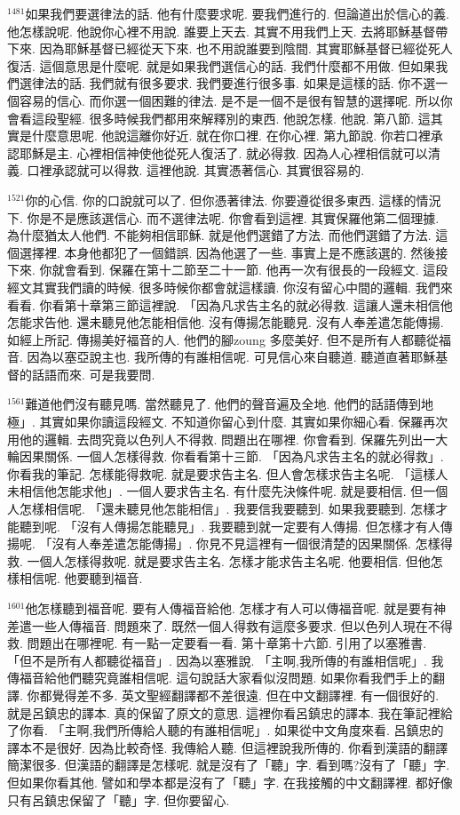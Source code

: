\documentclass{book}
\begin{document}
$^{1481}$如果我們要選律法的話.
他有什麼要求呢.
要我們進行的.
但論道出於信心的義.
他怎樣說呢.
他說你心裡不用說.
誰要上天去.
其實不用我們上天.
去將耶穌基督帶下來.
因為耶穌基督已經從天下來.
也不用說誰要到陰間.
其實耶穌基督已經從死人復活.
這個意思是什麼呢.
就是如果我們選信心的話.
我們什麼都不用做.
但如果我們選律法的話.
我們就有很多要求.
我們要進行很多事.
如果是這樣的話.
你不選一個容易的信心.
而你選一個困難的律法.
是不是一個不是很有智慧的選擇呢.
所以你會看這段聖經.
很多時候我們都用來解釋別的東西.
他說怎樣.
他說.
第八節.
這其實是什麼意思呢.
他說這離你好近.
就在你口裡.
在你心裡.
第九節說.
你若口裡承認耶穌是主.
心裡相信神使他從死人復活了.
就必得救.
因為人心裡相信就可以清義.
口裡承認就可以得救.
這裡他說.
其實憑著信心.
其實很容易的.

$^{1521}$你的心信.
你的口說就可以了.
但你憑著律法.
你要遵從很多東西.
這樣的情況下.
你是不是應該選信心.
而不選律法呢.
你會看到這裡.
其實保羅他第二個理據.
為什麼猶太人他們.
不能夠相信耶穌.
就是他們選錯了方法.
而他們選錯了方法.
這個選擇裡.
本身他都犯了一個錯誤.
因為他選了一些.
事實上是不應該選的.
然後接下來.
你就會看到.
保羅在第十二節至二十一節.
他再一次有很長的一段經文.
這段經文其實我們讀的時候.
很多時候你都會就這樣讀.
你沒有留心中間的邏輯.
我們來看看.
你看第十章第三節這裡說.
「因為凡求告主名的就必得救.
這讓人還未相信他怎能求告他.
還未聽見他怎能相信他.
沒有傳揚怎能聽見.
沒有人奉差遣怎能傳揚.
如經上所記.
傳揚美好福音的人.
他們的腳zoung 多麼美好.
但不是所有人都聽從福音.
因為以塞亞說主也.
我所傳的有誰相信呢.
可見信心來自聽道.
聽道直著耶穌基督的話語而來.
可是我要問.

$^{1561}$難道他們沒有聽見嗎.
當然聽見了.
他們的聲音遍及全地.
他們的話語傳到地極」.
其實如果你讀這段經文.
不知道你留心到什麼.
其實如果你細心看.
保羅再次用他的邏輯.
去問究竟以色列人不得救.
問題出在哪裡.
你會看到.
保羅先列出一大輪因果關係.
一個人怎樣得救.
你看看第十三節.
「因為凡求告主名的就必得救」.
你看我的筆記.
怎樣能得救呢.
就是要求告主名.
但人會怎樣求告主名呢.
「這樣人未相信他怎能求他」.
一個人要求告主名.
有什麼先決條件呢.
就是要相信.
但一個人怎樣相信呢.
「還未聽見他怎能相信」.
我要信我要聽到.
如果我要聽到.
怎樣才能聽到呢.
「沒有人傳揚怎能聽見」.
我要聽到就一定要有人傳揚.
但怎樣才有人傳揚呢.
「沒有人奉差遣怎能傳揚」.
你見不見這裡有一個很清楚的因果關係.
怎樣得救.
一個人怎樣得救呢.
就是要求告主名.
怎樣才能求告主名呢.
他要相信.
但他怎樣相信呢.
他要聽到福音.

$^{1601}$他怎樣聽到福音呢.
要有人傳福音給他.
怎樣才有人可以傳福音呢.
就是要有神差遣一些人傳福音.
問題來了.
既然一個人得救有這麼多要求.
但以色列人現在不得救.
問題出在哪裡呢.
有一點一定要看一看.
第十章第十六節.
引用了以塞雅書.
「但不是所有人都聽從福音」.
因為以塞雅說.
「主啊,我所傳的有誰相信呢」.
我傳福音給他們聽究竟誰相信呢.
這句說話大家看似沒問題.
如果你看我們手上的翻譯.
你都覺得差不多.
英文聖經翻譯都不差很遠.
但在中文翻譯裡.
有一個很好的.
就是呂鎮忠的譯本.
真的保留了原文的意思.
這裡你看呂鎮忠的譯本.
我在筆記裡給了你看.
「主啊,我們所傳給人聽的有誰相信呢」.
如果從中文角度來看.
呂鎮忠的譯本不是很好.
因為比較奇怪.
我傳給人聽.
但這裡說我所傳的.
你看到漢語的翻譯簡潔很多.
但漢語的翻譯是怎樣呢.
就是沒有了「聽」字.
看到嗎?沒有了「聽」字.
但如果你看其他.
譬如和學本都是沒有了「聽」字.
在我接觸的中文翻譯裡.
都好像只有呂鎮忠保留了「聽」字.
但你要留心.
\end{document}

